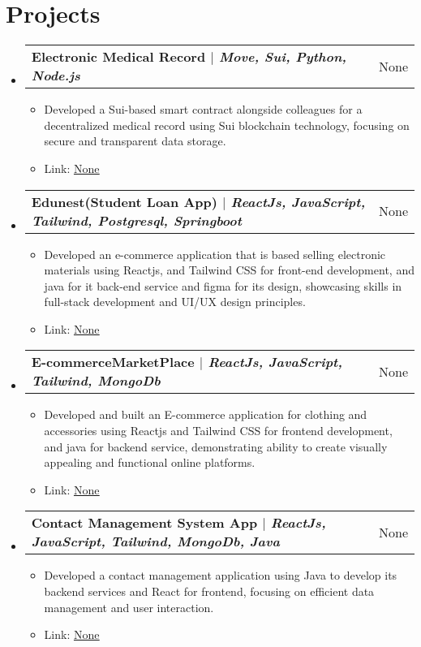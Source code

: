 \documentclass[letterpaper,11pt]{article}
\makeatletter
\newcommand{\resumeItem}[1]{
  \item\small{
    {#1 \vspace{-2pt}}
  }
}
\newcommand{\resumeProjectHeading}[2]{
    \item
    \begin{tabular*}{0.97\textwidth}{l@{\extracolsep{\fill}}r}
      \small#1 & #2 \\
    \end{tabular*}\vspace{-7pt}
}
\newcommand{\resumeSubHeadingListStart}{\begin{itemize}[leftmargin=0.15in, label={}]}
\newcommand{\resumeSubHeadingListEnd}{\end{itemize}}
\newcommand{\resumeItemListStart}{\begin{itemize}}
\newcommand{\resumeItemListEnd}{\end{itemize}\vspace{-5pt}}
\makeatother
\begin{document}
\section{Projects}
    \resumeSubHeadingListStart
      \resumeProjectHeading
          {\textbf{Electronic Medical Record $|$ \emph{Move, Sui, Python, Node.js}}}{None}
          \resumeItemListStart
            \resumeItem{Developed a Sui-based smart contract alongside colleagues for a decentralized medical record using Sui blockchain technology, focusing on secure and transparent data storage.}
            \resumeItem{Link: \href{None}{\underline{None}}}
          \resumeItemListEnd
      \resumeProjectHeading
          {\textbf{Edunest(Student Loan App) $|$ \emph{ReactJs, JavaScript, Tailwind, Postgresql, Springboot}}}{None}
          \resumeItemListStart
            \resumeItem{Developed an e-commerce application that is based selling electronic materials using Reactjs, and Tailwind CSS for front-end development, and java for it back-end service and figma for its design, showcasing skills in full-stack development and UI/UX design principles.}
            \resumeItem{Link: \href{None}{\underline{None}}}
          \resumeItemListEnd
      \resumeProjectHeading
          {\textbf{E-commerceMarketPlace $|$ \emph{ReactJs, JavaScript, Tailwind, MongoDb}}}{None}
          \resumeItemListStart
            \resumeItem{Developed and built an E-commerce application for clothing and accessories using Reactjs and Tailwind CSS for frontend development, and java for backend service, demonstrating ability to create visually appealing and functional online platforms.}
            \resumeItem{Link: \href{None}{\underline{None}}}
          \resumeItemListEnd
      \resumeProjectHeading
          {\textbf{Contact Management System App $|$ \emph{ReactJs, JavaScript, Tailwind, MongoDb, Java}}}{None}
          \resumeItemListStart
            \resumeItem{Developed a contact management application using Java to develop its backend services and React for frontend, focusing on efficient data management and user interaction.}
            \resumeItem{Link: \href{None}{\underline{None}}}
          \resumeItemListEnd
    \resumeSubHeadingListEnd

\end{document}
